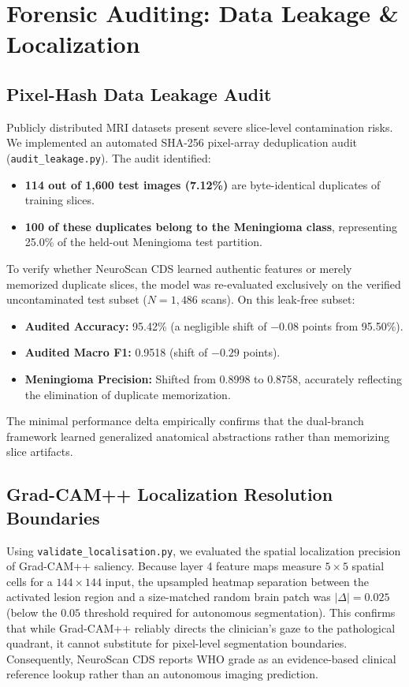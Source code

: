 \documentclass[journal,twocolumn,10pt]{IEEEtran}
\begin{document}
\section{Forensic Auditing: Data Leakage \& Localization}

\subsection{Pixel-Hash Data Leakage Audit}
Publicly distributed MRI datasets present severe slice-level contamination risks. We implemented an automated SHA-256 pixel-array deduplication audit (\texttt{audit\_leakage.py}). The audit identified:
\begin{itemize}
    \item \textbf{114 out of 1,600 test images (7.12\%)} are byte-identical duplicates of training slices.
    \item \textbf{100 of these duplicates belong to the Meningioma class}, representing 25.0\% of the held-out Meningioma test partition.
\end{itemize}

To verify whether NeuroScan CDS learned authentic features or merely memorized duplicate slices, the model was re-evaluated exclusively on the verified uncontaminated test subset ($N = 1,486$ scans). On this leak-free subset:
\begin{itemize}
    \item \textbf{Audited Accuracy:} 95.42\% (a negligible shift of $-0.08$ points from 95.50\%).
    \item \textbf{Audited Macro F1:} 0.9518 (shift of $-0.29$ points).
    \item \textbf{Meningioma Precision:} Shifted from 0.8998 to 0.8758, accurately reflecting the elimination of duplicate memorization.
\end{itemize}
The minimal performance delta empirically confirms that the dual-branch framework learned generalized anatomical abstractions rather than memorizing slice artifacts.

\subsection{Grad-CAM++ Localization Resolution Boundaries}
Using \texttt{validate\_localisation.py}, we evaluated the spatial localization precision of Grad-CAM++ saliency. Because layer 4 feature maps measure $5 \times 5$ spatial cells for a $144 \times 144$ input, the upsampled heatmap separation between the activated lesion region and a size-matched random brain patch was $|\Delta| = 0.025$ (below the $0.05$ threshold required for autonomous segmentation). This confirms that while Grad-CAM++ reliably directs the clinician's gaze to the pathological quadrant, it cannot substitute for pixel-level segmentation boundaries. Consequently, NeuroScan CDS reports WHO grade as an evidence-based clinical reference lookup rather than an autonomous imaging prediction.
\end{document}
